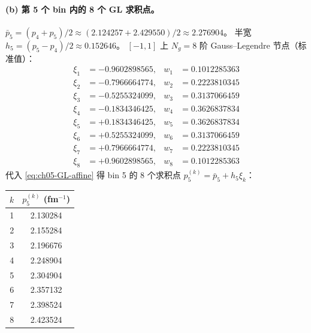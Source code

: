 \begin{numericalbox}[label={box:ch06-numerical-closure}]
\paragraph{(b) 第 5 个 bin 内的 8 个 GL 求积点。}
\(\bar{p}_5 = (p_4 + p_5)/2 \approx (2.124257 + 2.429550)/2 \approx
2.276904\)。
半宽 \(h_5 = (p_5 - p_4)/2 \approx 0.152646\)。
\([-1, 1]\) 上 \(N_g = 8\) 阶 Gauss--Legendre 节点（标准值）：
\begin{align*}
\xi_1 &= -0.9602898565, & w_1 &= 0.1012285363\\
\xi_2 &= -0.7966664774, & w_2 &= 0.2223810345\\
\xi_3 &= -0.5255324099, & w_3 &= 0.3137066459\\
\xi_4 &= -0.1834346425, & w_4 &= 0.3626837834\\
\xi_5 &= +0.1834346425, & w_5 &= 0.3626837834\\
\xi_6 &= +0.5255324099, & w_6 &= 0.3137066459\\
\xi_7 &= +0.7966664774, & w_7 &= 0.2223810345\\
\xi_8 &= +0.9602898565, & w_8 &= 0.1012285363
\end{align*}
代入 \cref{eq:ch05-GL-affine} 得 bin 5 的 8 个求积点
\(p_5^{(k)} = \bar{p}_5 + h_5 \xi_k\)：
\begin{center}
\begin{tabular}{cc}
\toprule
\(k\) & \(p_5^{(k)}\) (fm\(^{-1}\)) \\
\midrule
 1 & 2.130284 \\
 2 & 2.155284 \\
 3 & 2.196676 \\
 4 & 2.248904 \\
 5 & 2.304904 \\
 6 & 2.357132 \\
 7 & 2.398524 \\
 8 & 2.423524 \\
\bottomrule
\end{tabular}
\end{center}


\end{numericalbox}
